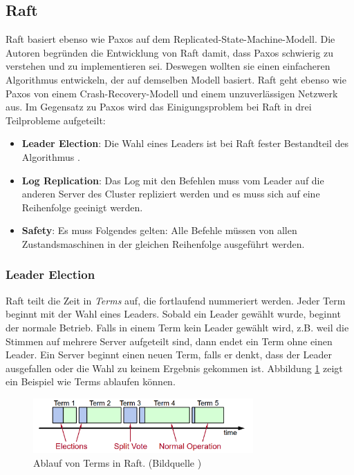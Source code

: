 \subsection{Raft}
\label{raft}

Raft \cite{raft, raft-thesis} basiert ebenso wie Paxos auf dem Replicated-State-Machine-Modell. Die Autoren begründen die Entwicklung von Raft damit, dass Paxos schwierig zu verstehen und zu implementieren sei. Deswegen wollten sie einen einfacheren Algorithmus entwickeln, der auf demselben Modell basiert. Raft geht ebenso wie Paxos von einem Crash-Recovery-Modell und einem unzuverlässigen Netzwerk aus.
Im Gegensatz zu Paxos wird das Einigungsproblem bei Raft in drei Teilprobleme aufgeteilt:
\begin{itemize}
	\item \textbf{Leader Election}: Die Wahl eines Leaders ist bei Raft fester Bestandteil des Algorithmus .
	\item \textbf{Log Replication}: Das Log mit den Befehlen muss vom Leader auf die anderen Server des Cluster repliziert werden und es muss sich auf eine Reihenfolge geeinigt werden.
	\item \textbf{Safety}: Es muss Folgendes gelten: Alle Befehle müssen von allen Zustandsmaschinen in der gleichen Reihenfolge ausgeführt werden.
\end{itemize}

\subsubsection{Leader Election}

Raft teilt die Zeit in \textit{Terms} auf, die fortlaufend nummeriert werden. Jeder Term beginnt mit der Wahl eines Leaders. Sobald ein Leader gewählt wurde, beginnt der normale Betrieb. Falls in einem Term kein Leader gewählt wird, z.B. weil die Stimmen auf mehrere Server aufgeteilt sind, dann endet ein Term ohne einen Leader. Ein Server beginnt einen neuen Term, falls er denkt, dass der Leader ausgefallen oder die Wahl zu keinem Ergebnis gekommen ist. Abbildung \ref{fig:terms} zeigt ein Beispiel wie Terms ablaufen können. \\

\begin{figure}[H]
	\centering
	\includegraphics[width=0.75\textwidth]{img/terms.png}
	\caption{Ablauf von Terms in Raft.  (Bildquelle \cite{raft-user-study})}
	\label{fig:terms}
\end{figure}

